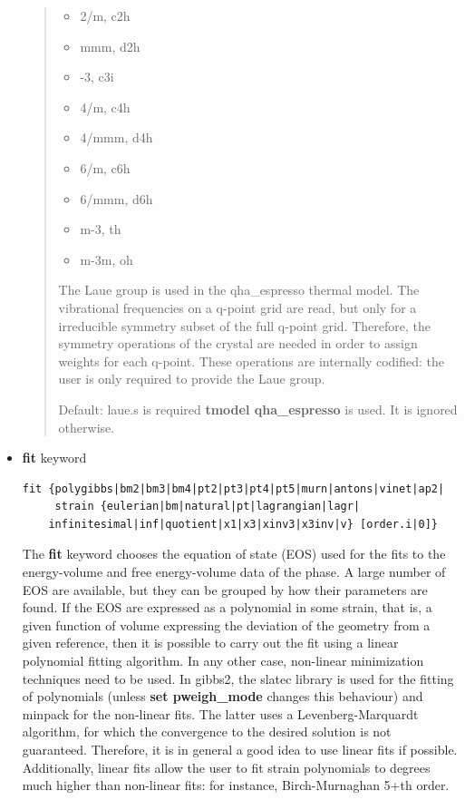 \documentclass[a4paper]{article}
\begin{document}
\begin{itemize}
\begin{quote}
\begin{itemize}
\item 2/m, c2h

\item mmm, d2h

\item -3, c3i

\item 4/m, c4h

\item 4/mmm, d4h

\item 6/m, c6h

\item 6/mmm, d6h

\item m-3, th

\item m-3m, oh

\end{itemize}

The Laue group is used in the qha\_espresso thermal model. The
vibrational frequencies on a q-point grid are read, but only for a
irreducible symmetry subset of the full q-point grid. Therefore, the
symmetry operations of the crystal are needed in order to assign
weights for each q-point. These operations are internally codified:
the user is only required to provide the Laue group.

Default: laue.s is required \textbf{tmodel qha\_espresso} is used. It is
ignored otherwise.

\end{quote}

\item \textbf{fit} keyword
%
\gibbslist
\begin{lstlisting}
fit {polygibbs|bm2|bm3|bm4|pt2|pt3|pt4|pt5|murn|antons|vinet|ap2|
     strain {eulerian|bm|natural|pt|lagrangian|lagr|
    infinitesimal|inf|quotient|x1|x3|xinv3|x3inv|v} [order.i|0]}
\end{lstlisting}

The \textbf{fit} keyword chooses the equation of state (EOS) used for
the fits to the energy-volume and free energy-volume data of the
phase. A large number of EOS are available, but they can be grouped
by how their parameters are found. If the EOS are expressed as a
polynomial in some strain, that is, a given function of volume
expressing the deviation of the geometry from a given reference,
then it is possible to carry out the fit using a linear polynomial
fitting algorithm. In any other case, non-linear minimization
techniques need to be used. In gibbs2, the slatec library is used
for the fitting of polynomials (unless \textbf{set pweigh\_mode} changes
this behaviour)  and minpack for the non-linear fits. The latter
uses a Levenberg-Marquardt algorithm, for which the convergence to
the desired solution is not guaranteed. Therefore, it is in general
a good idea to use linear fits if possible. Additionally, linear
fits allow the user to fit strain polynomials to degrees much
higher than non-linear fits: for instance, Birch-Murnaghan 5+th
order.


\end{itemize}
\end{document}
